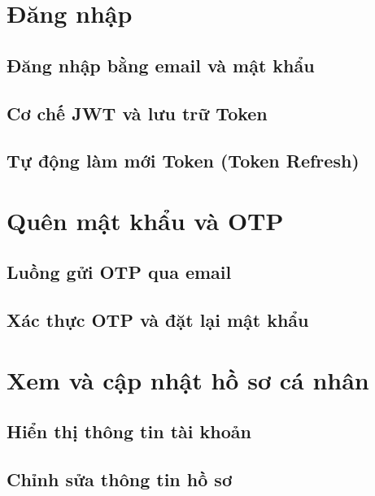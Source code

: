 \section{Đăng nhập}

\subsection{Đăng nhập bằng email và mật khẩu}


\subsection{Cơ chế JWT và lưu trữ Token}


\subsection{Tự động làm mới Token (Token Refresh)}


\section{Quên mật khẩu và OTP}

\subsection{Luồng gửi OTP qua email}


\subsection{Xác thực OTP và đặt lại mật khẩu}


\section{Xem và cập nhật hồ sơ cá nhân}

\subsection{Hiển thị thông tin tài khoản}


\subsection{Chỉnh sửa thông tin hồ sơ}


